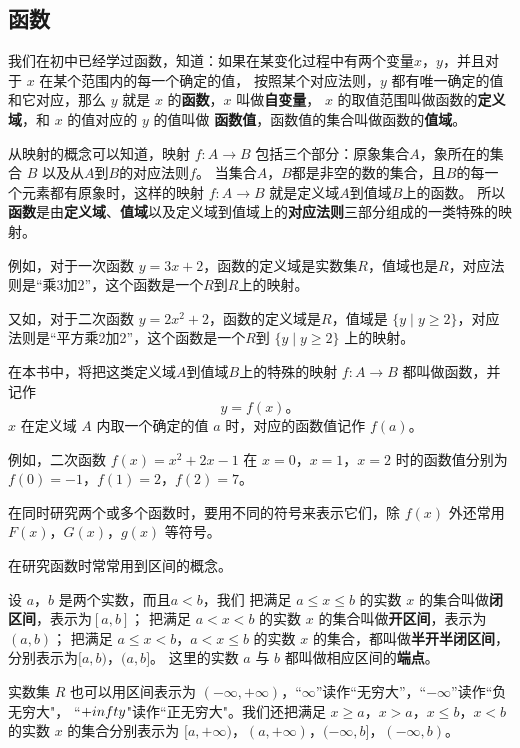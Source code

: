 \subsection{函数}

我们在初中已经学过函数，知道：如果在某变化过程中有两个变量$x$，$y$，并且对于 $x$ 在某个范围内的每一个确定的值，
按照某个对应法则，$y$ 都有唯一确定的值和它对应，那么 $y$ 就是 $x$ 的\textbf{函数}，$x$ 叫做\textbf{自变量}，
$x$ 的取值范围叫做函数的\textbf{定义域}，和 $x$ 的值对应的 $y$ 的值叫做 \textbf{函数值}，函数值的集合叫做函数的\textbf{值域}。

从映射的概念可以知道，映射 $f: A \to B$ 包括三个部分：原象集合$A$，象所在的集合 $B$ 以及从$A$到$B$的对应法则$f$。
当集合$A$，$B$都是非空的数的集合，且$B$的每一个元素都有原象时，这样的映射 $f: A \to B$ 就是定义域$A$到值域$B$上的函数。
所以\textbf{函数}是由\textbf{定义域}、\textbf{值域}以及定义域到值域上的\textbf{对应法则}三部分组成的一类特殊的映射。

例如，对于一次函数 $y=3x+2$，函数的定义域是实数集$R$，值域也是$R$，对应法则是“乘3加2”，这个函数是一个$R$到$R$上的映射。

又如，对于二次函数 $y=2x^2+2$，函数的定义域是$R$，值域是 $\{y \mid y \geqslant 2\}$，对应法则是“平方乘2加2”，这个函数是一个$R$到 $\{y \mid y \geqslant 2\}$ 上的映射。

在本书中，将把这类定义域$A$到值域$B$上的特殊的映射 $f : A \to B$ 都叫做函数，并记作
$$y = f(x) \text{。}$$
$x$ 在定义域 $A$ 内取一个确定的值 $a$ 时，对应的函数值记作 $f(a)$。

例如，二次函数 $f(x)=x^2+2x-1$ 在 $x=0$，$x=1$，$x=2$ 时的函数值分别为 $f(0)=-1$，$f(1)=2$，$f(2)=7$。

在同时研究两个或多个函数时，要用不同的符号来表示它们，除 $f(x)$ 外还常用 $F(x)$，$G(x)$，$g(x)$ 等符号。

在研究函数时常常用到区间的概念。

设 $a$，$b$ 是两个实数，而且$a<b$，我们
把满足 $a \leqslant x \leqslant b$ 的实数 $x$ 的集合叫做\textbf{闭区间}，表示为$[a,b]$；
把满足 $a < x < b$ 的实数 $x$ 的集合叫做\textbf{开区间}，表示为 $(a, b)$；
把满足 $a \leqslant x < b$，$a < x \leqslant b$ 的实数 $x$ 的集合，都叫做\textbf{半开半闭区间}，分别表示为$[a,b)$，$(a,b]$。
这里的实数 $a$ 与 $b$ 都叫做相应区间的\textbf{端点}。

实数集 $R$ 也可以用区间表示为 $(-\infty, +\infty)$，“$\infty$”读作“无穷大”，“$-\infty$”读作“负无穷大"，
“$+\\infty$"读作“正无穷大"。我们还把满足 $x \geqslant a$，$x > a$，$x \leqslant b$，$x < b$ 的实数 $x$
的集合分别表示为 $[a, +\infty)$，$(a, +\infty)$，$(-\infty, b]$，$(-\infty, b)$。

